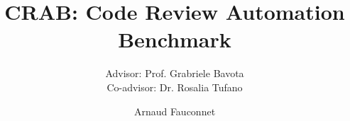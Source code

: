 \documentclass{si-msc-proposal}
\author{Arnaud Fauconnet}
\title{CRAB: Code Review Automation Benchmark}
\subtitle{Advisor: Prof. Grabriele Bavota\\Co-advisor: Dr. Rosalia Tufano}
\begin{document}
\maketitle

\listoftodos







\newpage


\end{document}
